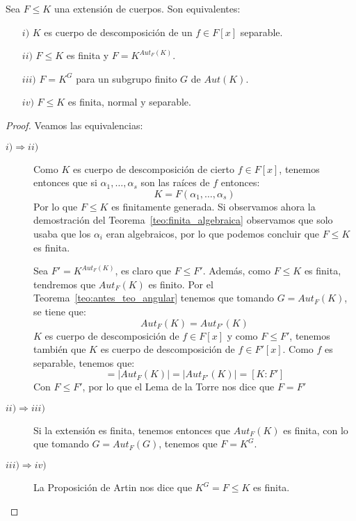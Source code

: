 
\begin{teo}
    Sea $F\leq K$ una extensión de cuerpos. Son equivalentes: 
    \begin{enumerate}
        \item[$i)$] $K$ es cuerpo de descomposición de un $f\in F[x]$ separable.
        \item[$ii)$] $F\leq K$ es finita y $F = K^{Aut_F(K)}$.
        \item[$iii)$] $F = K^G$ para un subgrupo finito $G$ de $Aut(K)$.
        \item[$iv)$] $F\leq K$ es finita, normal y separable.
    \end{enumerate}
    \begin{proof}
        Veamos las equivalencias:
        \begin{description}
            \item [$i)\Longrightarrow  ii)$] Como $K$ es cuerpo de descomposición de cierto $f\in F[x]$, tenemos entonces que si $\alpha_1, \ldots, \alpha_s$ son las raíces de $f$ entonces:
                \begin{equation*}
                    K = F(\alpha_1, \ldots, \alpha_s)
                \end{equation*}
                Por lo que $F\leq K$ es finitamente generada. Si observamos ahora la demostración del Teorema~\ref{teo:finita_algebraica} observamos que solo usaba que los $\alpha_i$ eran algebraicos, por lo que podemos concluir que $F\leq K$ es finita.

                Sea $F' = K^{Aut_F(K)}$, es claro que $F\leq F'$. Además, como $F\leq K$ es finita, tendremos que $Aut_F(K)$ es finito. Por el Teorema~\ref{teo:antes_teo_angular} tenemos que tomando $G = Aut_F(K)$, se tiene que:
                \begin{equation*}
                    Aut_F(K) = Aut_{F'}(K)
                \end{equation*}
                $K$ es cuerpo de descomposición de $f\in F[x]$ y como $F\leq F'$, tenemos también que $K$ es cuerpo de descomposición de $f\in F'[x]$. Como $f$ es separable, tenemos que:
                \begin{equation*}
                    [K:F] = |Aut_F(K)| = |Aut_{F'}(K)| = [K:F']
                \end{equation*}
                Con $F\leq F'$, por lo que el Lema de la Torre nos dice que $F = F'$
            \item [$ii)\Longrightarrow iii)$] Si la extensión es finita, tenemos entonces que $Aut_F(K)$ es finita, con lo que tomando $G= Aut_F(G)$, tenemos que $F=K^G$.
            \item [$iii)\Longrightarrow iv)$] La Proposición de Artin nos dice que $K^G = F\leq K$ es finita. 


\end{description}
\end{proof}
\end{teo}
